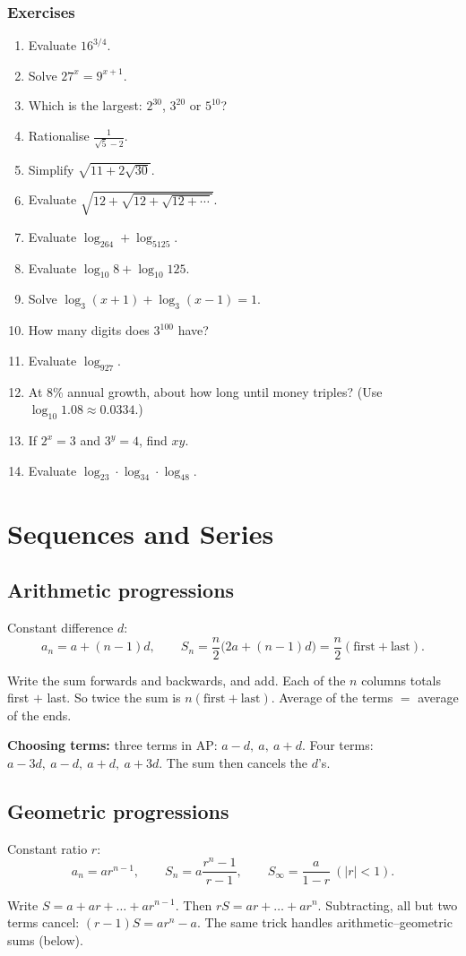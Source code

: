 \documentclass[11pt,a4paper,openany]{report}
\newenvironment{exercises}{\subsection*{Exercises \thechapter}\begin{enumerate}[label=\textbf{\thechapter.\arabic*},leftmargin=3.2em]}{\end{enumerate}}
\begin{document}
\begin{exercises}
\item Evaluate $16^{3/4}$.
\item Solve $27^x=9^{x+1}$.
\item Which is the largest: $2^{30}$, $3^{20}$ or $5^{10}$?
\item Rationalise $\frac1{\sqrt5-2}$.
\item Simplify $\sqrt{11+2\sqrt{30}}$.
\item Evaluate $\sqrt{12+\sqrt{12+\sqrt{12+\cdots}}}$.
\item Evaluate $\log_264+\log_5125$.
\item Evaluate $\log_{10}8+\log_{10}125$.
\item Solve $\log_3(x+1)+\log_3(x-1)=1$.
\item How many digits does $3^{100}$ have?
\item Evaluate $\log_927$.
\item At 8\% annual growth, about how long until money triples? (Use $\log_{10}1.08\approx0.0334$.)
\item If $2^x=3$ and $3^y=4$, find $xy$.
\item Evaluate $\log_23\cdot\log_34\cdot\log_48$.
\end{exercises}

\chapter{Sequences and Series}\label{ch:seq}

\section{Arithmetic progressions}
Constant difference $d$:
\[a_n=a+(n-1)d,\qquad S_n=\frac n2\big(2a+(n-1)d\big)=\frac n2(\text{first}+\text{last}).\]
\begin{why}
Write the sum forwards and backwards, and add. Each of the $n$ columns totals first $+$ last. So twice the sum is $n(\text{first}+\text{last})$. Average of the terms $=$ average of the ends.
\end{why}
\textbf{Choosing terms:} three terms in AP: $a-d,\ a,\ a+d$. Four terms: $a-3d,\ a-d,\ a+d,\ a+3d$. The sum then cancels the $d$'s.

\section{Geometric progressions}
Constant ratio $r$:
\[a_n=ar^{n-1},\qquad S_n=a\frac{r^n-1}{r-1},\qquad S_\infty=\frac a{1-r}\ (|r|<1).\]
\begin{why}
Write $S=a+ar+\dots+ar^{n-1}$. Then $rS=ar+\dots+ar^n$. Subtracting, all but two terms cancel: $(r-1)S=ar^n-a$. The same trick handles arithmetic--geometric sums (below).
\end{why}
\end{document}
